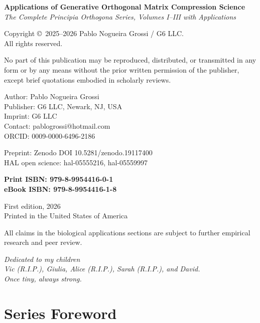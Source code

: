 \documentclass[12pt, oneside]{book}
\theoremstyle{plain}
\theoremstyle{definition}
\theoremstyle{remark}
\begin{document}
\thispagestyle{empty}
\vspace*{2cm}
{\small
\noindent\textbf{Applications of Generative Orthogonal Matrix Compression Science}\\
\textit{The Complete Principia Orthogona Series, Volumes I--III with Applications}

\bigskip
\noindent Copyright \copyright\ 2025--2026 Pablo Nogueira Grossi / G6 LLC.\\
All rights reserved.

\bigskip
\noindent No part of this publication may be reproduced, distributed, or transmitted
in any form or by any means without the prior written permission of the publisher,
except brief quotations embodied in scholarly reviews.

\bigskip
\noindent Author: Pablo Nogueira Grossi\\
Publisher: G6 LLC, Newark, NJ, USA\\
Imprint: G6 LLC\\
Contact: pablogrossi@hotmail.com\\
ORCID: 0009-0000-6496-2186

\bigskip
\noindent Preprint: Zenodo DOI 10.5281/zenodo.19117400\\
HAL open science: hal-05555216, hal-05559997

\bigskip
\noindent\textbf{Print ISBN: 979-8-9954416-0-1}\\
\textbf{eBook ISBN: 979-8-9954416-1-8}

\bigskip
\noindent First edition, 2026\\
Printed in the United States of America

\bigskip
{\footnotesize All claims in the biological applications sections are subject to
further empirical research and peer review.}
}
\cleardoublepage

\thispagestyle{empty}
\vspace*{6cm}
\begin{center}
  \itshape
  Dedicated to my children\\[0.5em]
  Vic (R.I.P.), Giulia, Alice (R.I.P.), Sarah (R.I.P.), and David.\\[1em]
  \normalfont\textit{Once tiny, always strong.}
\end{center}
\cleardoublepage

\chapter*{Series Foreword}
\end{document}
